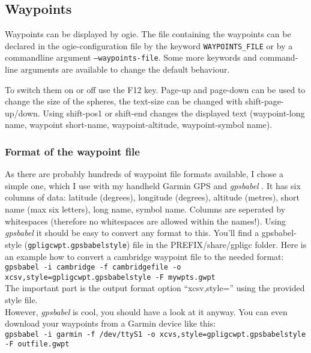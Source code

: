 

\subsection{Waypoints}
\label{wp}

Waypoints can be displayed by ogie.
The file containing the waypoints can be declared in the ogie-configuration file by the keyword \texttt{WAYPOINTS\_FILE} or by a commandline argument \texttt{--waypoints-file}. Some more keywords and command-line arguments are available to change the default behaviour.

To switch them on or off use the F12 key. Page-up and page-down can be used to change the size of the spheres, the text-size can be changed with shift-page-up/down. Using shift-pos1 or shift-end changes the displayed text (waypoint-long name, waypoint short-name, waypoint-altitude, waypoint-symbol name).

\subsubsection{Format of the waypoint file}
As there are probably hundreds of waypoint file formats available, I chose a simple one, which I use with my handheld Garmin GPS and \emph{gpsbabel} \cite{gpsbabel}.
It has six columns of data: latitude (degrees), longitude (degrees), altitude (metres), short name (max six letters), long name, symbol name.
Columns are seperated by whitespaces (therefore no whitespaces are allowed within the names!).
Using \emph{gpsbabel} it should be easy to convert any format to this.
You'll find a gpsbabel-style (\texttt{gpligcwpt.gpsbabelstyle}) file in the PREFIX/share/gpligc folder.
Here is an example how to convert a cambridge waypoint file to the needed format:\\

\texttt{gpsbabel -i cambridge -f cambridgefile  -o xcsv,style=gpligcwpt.gpsbabelstyle -F mywpts.gwpt}\\
The important part is the output format option ``xcsv,style='' using the provided style file.\\
However, \emph{gpsbabel} is cool, you should have a look at it anyway.
You can even download your waypoints from a Garmin device like this:\\
\texttt{gpsbabel -i garmin -f /dev/ttyS1 -o xcvs,style=gpligcwpt.gpsbabelstyle -F outfile.gwpt}
